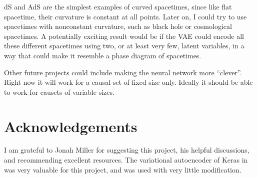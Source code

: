 \documentclass[letterpaper,10pt]{article}
\begin{document}
dS and AdS are the simplest examples of curved spacetimes, since like flat spacetime, their curvature is constant at all points.  Later on, I could 
try to use spacetimes with nonconstant curvature, such as black hole or cosmological spacetimes.  A potentially exciting result would be if the VAE 
could encode all these different spacetimes using two, or at least very few, latent variables, in a way that could make it resemble a phase diagram of 
spacetimes.

Other future projects could include making the neural network more ``clever''.  Right now it will work for a causal set of fixed size only.  Ideally 
it should be able to work for causets of variable sizes.



\section{Acknowledgements}
I am grateful to Jonah Miller for suggesting this project, his helpful discussions, and recommending excellent resources.  
The variational autoencoder of Keras in \cite{kerasauto} was very valuable for this project, and was used with very little modification.
\end{document}
